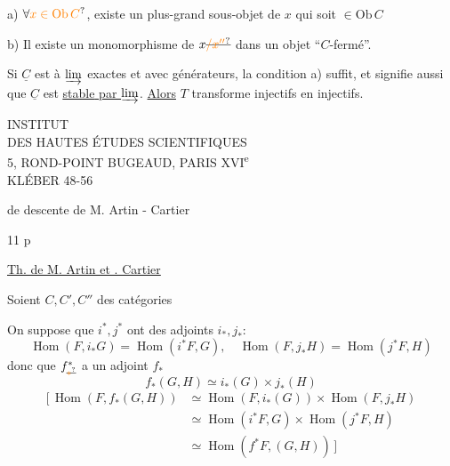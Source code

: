 a) $\forall\unsure{x\in\mathrm{Ob}\,C}$, existe un plus-grand sous-objet  de $x$ qui soit $\in\mathrm{Ob}\,C$


b)  Il existe un monomorphisme de $x\deleted{\unsure{/x''}}$ dans un objet ``$C$-fermé''.

Si $\underline C$ est à $\varinjlim$ exactes et avec générateurs, la condition a) suffit, et signifie aussi que $\underline C$ est \uline{\uline{stable} par $\varinjlim$}. \uline{Alors} $T$ transforme injectifs en injectifs.

\begin{center}
INSTITUT\\
DES HAUTES ÉTUDES SCIENTIFIQUES\\
5, ROND-POINT BUGEAUD, PARIS XVI\textsuperscript{e}\\
KLÉBER 48-56
\end{center}



 de descente de M. Artin - Cartier

11 p




\uline{Th. de M. Artin et . Cartier}

Soient $C,C',C''$ des catégories

On suppose que $i^*,j^*$ ont des adjoints $i_*,j_*:$
\[
\operatorname{Hom}(F,i_*G)=\operatorname{Hom}(i^*F,G),\quad
\operatorname{Hom}(F,j_*H)=\operatorname{Hom}(j^*F,H)
\]
donc que $f_{\deleted{\unsure{*}}}^{*}$ a un adjoint $f_*$
\[
f_*(G,H)\simeq i_*(G)\times j_*(H)
\]
\[
\begin{aligned}
[\,\operatorname{Hom}(F,f_*(G,H))&\simeq\operatorname{Hom}(F,i_*(G))\times\operatorname{Hom}(F,j_*H)\\
&\simeq\operatorname{Hom}(i^*F,G)\times\operatorname{Hom}(j^*F,H)\\
&\simeq\operatorname{Hom}(f^*F,(G,H))\,]
\end{aligned}
\]

